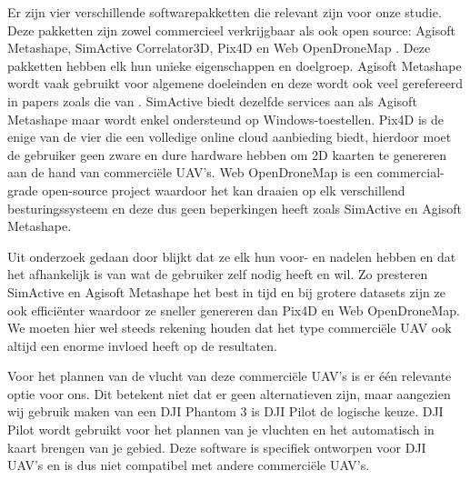 \documentclass{hogent-article}
\begin{document}
Er zijn vier verschillende softwarepakketten die relevant zijn voor onze studie. Deze pakketten zijn zowel commercieel verkrijgbaar als ook open source: Agisoft Metashape\textsuperscript{\textregistered}, SimActive Correlator3D\textsuperscript{\textregistered}, Pix4D\textsuperscript{\textregistered} en Web OpenDroneMap\textsuperscript{\textregistered} \autocite{pell2022demystifying}.
Deze pakketten hebben elk hun unieke eigenschappen en doelgroep. Agisoft Metashape\textsuperscript{\textregistered} wordt vaak gebruikt voor algemene doeleinden en deze wordt ook veel gerefereerd in papers zoals die van \textcite{pell2022demystifying}.
SimActive\textsuperscript{\textregistered} biedt dezelfde services aan als Agisoft Metashape\textsuperscript{\textregistered} maar wordt enkel ondersteund op Windows-toestellen. Pix4D\textsuperscript{\textregistered} is de enige van de vier die een volledige online cloud aanbieding biedt, hierdoor moet de gebruiker geen zware en dure hardware hebben om 2D kaarten te genereren aan de hand van commerciële UAV's.
Web OpenDroneMap\textsuperscript{\textregistered} is een commercial-grade open-source project waardoor het kan draaien op elk verschillend besturingssysteem en deze dus geen beperkingen heeft zoals SimActive\textsuperscript{\textregistered} en Agisoft Metashape\textsuperscript{\textregistered}.

Uit onderzoek gedaan door \textcite{pell2022demystifying} blijkt dat ze elk hun voor- en nadelen hebben en dat het afhankelijk is van wat de gebruiker zelf nodig heeft en wil. Zo presteren SimActive\textsuperscript{\textregistered} en Agisoft Metashape\textsuperscript{\textregistered} het best in tijd en bij grotere datasets zijn ze ook efficiënter waardoor ze sneller genereren dan Pix4D\textsuperscript{\textregistered} en Web OpenDroneMap\textsuperscript{\textregistered}.
We moeten hier wel steeds rekening houden dat het type commerciële UAV ook altijd een enorme invloed heeft op de resultaten.

Voor het plannen van de vlucht van deze commerciële UAV's is er één relevante optie voor ons. Dit betekent niet dat er geen alternatieven zijn, maar aangezien wij gebruik maken van een DJI Phantom 3\textsuperscript{\textregistered} is DJI Pilot\textsuperscript{\textregistered} de logische keuze.
DJI Pilot\textsuperscript{\textregistered} wordt gebruikt voor het plannen van je vluchten en het automatisch in kaart brengen van je gebied. Deze software is specifiek ontworpen voor DJI UAV's en is dus niet compatibel met andere commerciële UAV's.
\end{document}
